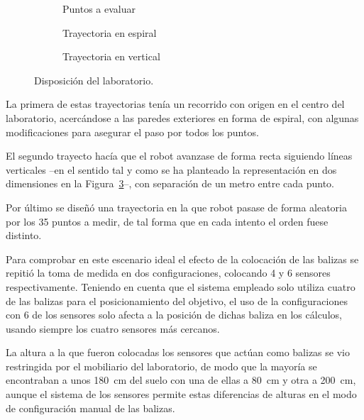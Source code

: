 \begin{figure}[H]
    \begin{subfigure}[b]{.3\textwidth}
      \centering
      \def\svgwidth{0.8\linewidth}
	     
      \caption{Puntos a evaluar}
      \label{fig:puntos}
    \end{subfigure}
    \begin{subfigure}[b]{.3\textwidth}
      \centering
      \def\svgwidth{0.8\linewidth}
	     
      \caption{Trayectoria en espiral}
      \label{fig:espiral}
    \end{subfigure}
    \begin{subfigure}[b]{.3\textwidth}
        \centering
        \def\svgwidth{0.8\linewidth}
	     
        \caption{Trayectoria en vertical}
        \label{fig:vertical}
      \end{subfigure}
    \caption{Disposición del laboratorio.}
    \label{fig:laboratorio}
\end{figure}

La primera de estas trayectorias tenía un recorrido con origen en el centro del laboratorio, acercándose a las paredes exteriores en forma de espiral, con algunas modificaciones para asegurar el paso por todos los puntos.

El segundo trayecto hacía que el robot avanzase de forma recta siguiendo líneas verticales --en el sentido tal y como se ha planteado la representación en dos dimensiones en la Figura~\ref{fig:vertical}--, con separación de un metro entre cada punto.

Por último se diseñó una trayectoria en la que robot pasase de forma aleatoria por los 35 puntos a medir, de tal forma que en cada intento el orden fuese distinto.

Para comprobar en este escenario ideal el efecto de la colocación de las balizas se repitió la toma de medida en dos configuraciones, colocando 4 y 6 sensores respectivamente.
Teniendo en cuenta que el sistema empleado solo utiliza cuatro de las balizas para el posicionamiento del objetivo, el uso de la configuraciones con 6 de los sensores solo afecta a la posición de dichas baliza en los cálculos, usando siempre los cuatro sensores más cercanos.

La altura a la que fueron colocadas los sensores que actúan como balizas se vio restringida por el mobiliario del laboratorio, de modo que la mayoría se encontraban a unos 180~cm del suelo con una de ellas a 80~cm y otra a 200~cm, aunque el sistema de los sensores permite estas diferencias de alturas en el modo de configuración manual de las balizas.

